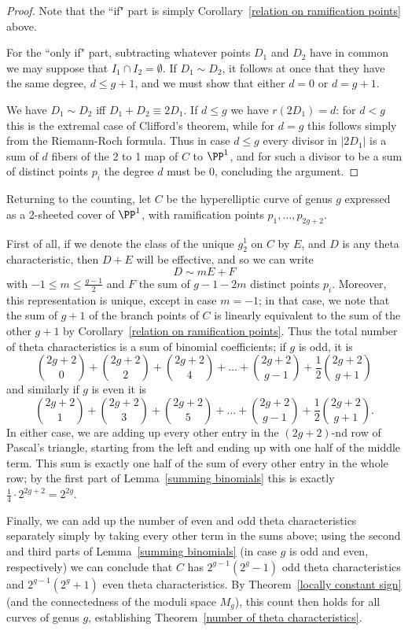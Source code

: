 \begin{proof}
Note that the ``if" part is simply Corollary~\ref{relation on ramification points} above.

For the ``only if" part, subtracting whatever points $D_1$ and $D_2$ have in common we may suppose
that $I_1\cap I_2 = \emptyset$. If $D_1\sim D_2$, it follows at once that they have the same degree, $d\leq g+1$, and we must show that either $d=0$ or $d=g+1$.

We have $D_1\sim D_2$ iff $D_1+D_2\equiv 2D_1$. If
$d\leq g$ we have $r(2D_1) = d$: for $d<g$ this is
the extremal case of Clifford's theorem, while for $d = g$ this follows simply from the 
Riemann-Roch formula. Thus in case $d \leq g$ every divisor in $|2D_1|$ is a sum of $d$ fibers of the 
2 to 1 map of $C$ to $\PP^1$, and for such a divisor to be a sum of distinct points $p_i$
the degree $d$ must be 0, concluding the argument.
\end{proof}


Returning to the counting, let $C$ be the hyperelliptic curve of genus $g$ expressed as a 2-sheeted cover of $\PP^1$, with ramification points $p_1,\dots,p_{2g+2}$. 

First of all, if we denote the class of the unique $g^1_2$ on $C$ by $E$, and $D$ is any theta characteristic, then $D+E$ will be effective, and so we can write
$$
D \sim mE + F
$$
with $-1 \leq m \leq \frac{g-1}{2}$ and $F$ the sum of $g-1-2m$ distinct points $p_i$. Moreover, this representation is unique, except in case $m=-1$; in that case, we note that the sum of $g+1$ of the branch points of $C$ is linearly equivalent to the sum of the other $g+1$ by Corollary~\ref{relation on ramification points}. Thus the total number of theta characteristics is a sum of binomial coefficients; if $g$ is odd, it is
$$
\binom{2g+2}{0} + \binom{2g+2}{2} + \binom{2g+2}{4} + \dots + \binom{2g+2}{g-1} + \frac{1}{2}\binom{2g+2}{g+1}
$$ 
and similarly if $g$ is even it is
$$
\binom{2g+2}{1} + \binom{2g+2}{3} + \binom{2g+2}{5} + \dots + \binom{2g+2}{g-1} + \frac{1}{2}\binom{2g+2}{g+1}.
$$ 
In either case, we are adding up every other entry in the $(2g+2)$-nd row of Pascal's triangle, starting from the left and ending up with one half of the middle term. This sum is exactly one half of the sum of every other entry in the whole row; by the first part of Lemma~\ref{summing binomials} this is exactly $\frac{1}{4} \cdot 2^{2g+2} = 2^{2g}$.

Finally, we can add up the number of even and odd theta characteristics separately simply by taking every other term in the sums above; using the second and third parts of Lemma~\ref{summing binomials} (in case $g$ is odd and even, respectively) we can conclude that $C$ has $2^{g-1}(2^g-1)$ odd theta characteristics and $2^{g-1}(2^g+1)$ even theta characteristics. By Theorem~\ref{locally constant sign} (and the connectedness of the moduli space $M_g$), this count then holds for all curves of genus $g$, establishing Theorem~\ref{number of theta characteristics}.

